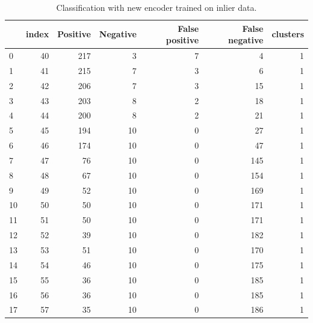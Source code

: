 \documentclass[a4paper,twoside,12pt]{book}
\begin{document}
\begin{appendices}
\begin{table}
	\centering
	\caption{Classification with new encoder trained on inlier data.}
	\label{id:tab:SVMencWLab}
	\begin{tabular}{lrrrrrr}
		\toprule
		{} &  index &  Positive &  Negative &  False positive &  False negative &  clusters \\
		\midrule
		0   &     40 &       217 &         3 &               7 &               4 &         1 \\
		1   &     41 &       215 &         7 &               3 &               6 &         1 \\
		2   &     42 &       206 &         7 &               3 &              15 &         1 \\
		3   &     43 &       203 &         8 &               2 &              18 &         1 \\
		4   &     44 &       200 &         8 &               2 &              21 &         1 \\
		5   &     45 &       194 &        10 &               0 &              27 &         1 \\
		6   &     46 &       174 &        10 &               0 &              47 &         1 \\
		7   &     47 &        76 &        10 &               0 &             145 &         1 \\
		8   &     48 &        67 &        10 &               0 &             154 &         1 \\
		9   &     49 &        52 &        10 &               0 &             169 &         1 \\
		10  &     50 &        50 &        10 &               0 &             171 &         1 \\
		11  &     51 &        50 &        10 &               0 &             171 &         1 \\
		12  &     52 &        39 &        10 &               0 &             182 &         1 \\
		13  &     53 &        51 &        10 &               0 &             170 &         1 \\
		14  &     54 &        46 &        10 &               0 &             175 &         1 \\
		15  &     55 &        36 &        10 &               0 &             185 &         1 \\
		16  &     56 &        36 &        10 &               0 &             185 &         1 \\
		17  &     57 &        35 &        10 &               0 &             186 &         1 \\

\end{tabular}
\end{table}
\end{appendices}
\end{document}
